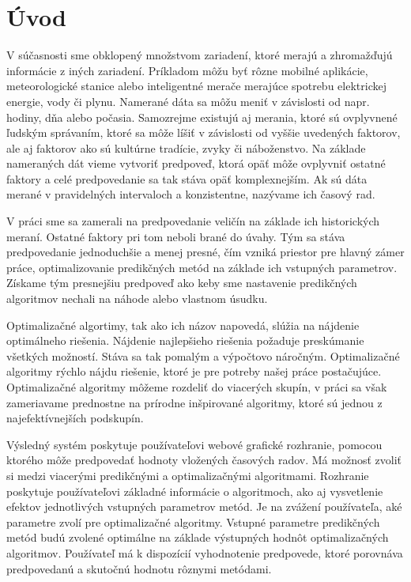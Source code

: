 \documentclass[a4paper,slovak,12pt,appendix]{article}
\begin{document}
\section{Úvod}
V súčasnosti sme obklopený množstvom zariadení, ktoré merajú a zhromažďujú
informácie z iných zariadení. Príkladom môžu byť rôzne mobilné aplikácie,
meteorologické stanice alebo inteligentné merače merajúce spotrebu elektrickej
energie, vody či plynu. Namerané dáta sa môžu meniť v závislosti od napr.
hodiny, dňa alebo počasia. Samozrejme existujú aj merania, ktoré sú ovplyvnené
ľudským správaním, ktoré sa môže líšiť v závislosti od vyššie uvedených
faktorov, ale aj faktorov ako sú kultúrne tradície, zvyky či náboženstvo. Na
základe nameraných dát vieme vytvoriť predpoveď, ktorá opäť môže ovplyvniť
ostatné faktory a celé predpovedanie sa tak stáva opäť komplexnejším. Ak sú
dáta merané v pravidelných intervaloch a konzistentne, nazývame ich časový rad.

V práci sme sa zamerali na predpovedanie veličín na základe ich historických
meraní. Ostatné faktory pri tom neboli brané do úvahy. Tým sa stáva
predpovedanie jednoduchšie a menej presné, čím vzniká priestor pre hlavný zámer
práce, optimalizovanie predikčných metód na základe ich vstupných parametrov.
Získame tým presnejšiu predpoveď ako keby sme nastavenie predikčných algoritmov
nechali na náhode alebo vlastnom úsudku.

Optimalizačné algortimy, tak ako ich názov napovedá, slúžia na nájdenie
optimálneho riešenia. Nájdenie najlepšieho riešenia požaduje preskúmanie
všetkých možností. Stáva sa tak pomalým a výpočtovo náročným. Optimalizačné
algoritmy rýchlo nájdu riešenie, ktoré je pre potreby našej práce postačujúce.
Optimalizačné algoritmy môžeme rozdeliť do viacerých skupín, v práci sa však
zameriavame prednostne na prírodne inšpirované algoritmy, ktoré sú jednou
z najefektívnejších podskupín.

Výsledný systém poskytuje používateľovi webové grafické rozhranie, pomocou
ktorého môže predpovedať hodnoty vložených časových radov. Má možnosť zvoliť si
medzi viacerými predikčnými a optimalizačnými algoritmami. Rozhranie poskytuje
používateľovi základné informácie o algoritmoch, ako aj vysvetlenie efektov
jednotlivých vstupných parametrov metód. Je na zvážení používateľa, aké
parametre zvolí pre optimalizačné algoritmy. Vstupné parametre predikčných
metód budú zvolené optimálne na základe výstupných hodnôt optimalizačných
algoritmov. Používateľ má k dispozícií vyhodnotenie predpovede, ktoré porovnáva
predpovedanú a skutočnú hodnotu rôznymi metódami.
\end{document}
